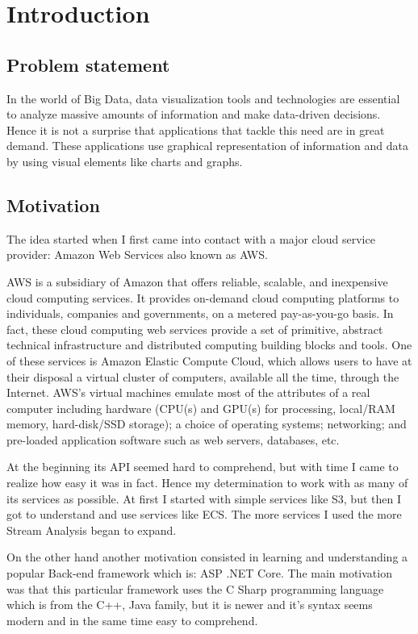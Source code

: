 \chapter{Introduction}
\label{chap:01}

\section{Problem statement}
\label{chap:01:01}
In the world of Big Data, data visualization tools and technologies are essential to analyze massive amounts of information and make data-driven decisions. Hence it is not a surprise that applications that tackle this need are in great demand. These applications use graphical representation of information and data by using visual elements like charts and graphs.

\section{Motivation}
\label{chap:01:02}
The idea started when I first came into contact with a major cloud service provider: Amazon Web Services also known as AWS.

AWS is a subsidiary of Amazon that offers reliable, scalable, and inexpensive cloud computing services. It provides on-demand cloud computing platforms to individuals, companies and governments, on a metered pay-as-you-go basis. In fact, these cloud computing web services provide a set of primitive, abstract technical infrastructure and distributed computing building blocks and tools. One of these services is Amazon Elastic Compute Cloud, which allows users to have at their disposal a virtual cluster of computers, available all the time, through the Internet. AWS's virtual machines emulate most of the attributes of a real computer including hardware (CPU(s) and GPU(s) for processing, local/RAM memory, hard-disk/SSD storage); a choice of operating systems; networking; and pre-loaded application software such as web servers, databases, etc. \cite{aws-overview}

At the beginning its API seemed hard to comprehend, but with time I came to realize how easy it was in fact. Hence my determination to work with as many of its services as possible. At first I started with simple services like S3, but then I got to understand and use services like ECS. The more services I used the more Stream Analysis began to expand.

On the other hand another motivation consisted in learning and understanding a popular Back-end framework which is: ASP .NET Core. The main motivation was that this particular framework uses the C Sharp programming language which is from the C++, Java family, but it is newer and it's syntax seems modern and in the same time easy to comprehend.

